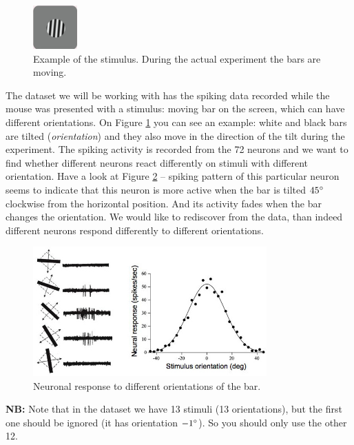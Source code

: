 \documentclass[a4paper,11pt]{article}
\begin{document}
\begin{figure}
	\centering
	\vspace{-12pt}
	\includegraphics[width=0.15\textwidth]{orientationstimulus.jpg}
	\caption{Example of the stimulus. During the actual experiment the bars are moving.}
	\label{fig:stimulusexample}
	\vspace{-5pt}
\end{figure}
The dataset we will be working with has the spiking data recorded while the mouse was presented with a stimulus: moving bar on the screen, which can have different orientations. On Figure \ref{fig:stimulusexample} you can see an example: white and black bars are tilted (\emph{orientation}) and they also move in the direction of the tilt during the experiment. The spiking activity is recorded from the 72 neurons and we want to find whether different neurons react differently on stimuli with different orientation. Have a look at Figure \ref{fig:orientationresponse} -- spiking pattern of this particular neuron seems to indicate that this neuron is more active when the bar is tilted $45\degree$ clockwise from the horizontal position. And its activity fades when the bar changes the orientation. We would like to rediscover from the data, than indeed different neurons respond differently to different orientations.
\begin{figure}[H]
	\centering
	\includegraphics[width=0.8\textwidth]{orientation.jpg} 
	\caption{Neuronal response to different orientations of the bar.}
	\label{fig:orientationresponse}
\end{figure}
\textbf{NB:} Note that in the dataset we have 13 stimuli (13 orientations), but the first one should be ignored (it has orientation $-1\degree$). So you should only use the other 12.
\end{document}
